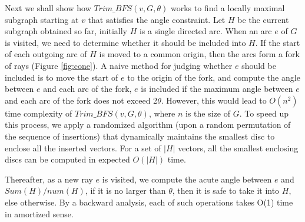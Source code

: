 Next we shall show how $Trim\_BFS(v, G, \theta)$ works to find a locally maximal subgraph starting at $v$ that satisfies the angle constraint. Let $H$ be the current subgraph obtained so far, initially $H$ is a single directed arc. When an arc $e$ of $G$ is visited, we need to determine whether it should be included into $H$. If the start of each outgoing arc of $H$ is moved to a common origin, then the arcs form a fork of rays (Figure \ref{fig:cone}). A naive method for judging whether $e$ should be included is to move the start of $e$ to the origin of the fork, and compute the angle between $e$ and each arc of the fork, $e$ is included if the maximum angle between $e$ and each arc of the fork does not exceed 2$\theta$. However, this would lead to $O(n^{2})$ time complexity of $Trim\_BFS(v, G, \theta)$, where $n$ is the size of $G$. To speed up this process, we apply a randomized algorithm (upon a random permutation of the sequence of insertions) that dynamically maintains the smallest disc to enclose all the inserted vectors. For a set of $|H|$ vectors, all the smallest enclosing discs can be computed in expected $O(|H|)$ time. {\color{red}{[de Berg M, van Kreveld M, Overmars M, Schwarzkopf O. Computational geometry: algorithms and applications. 3rd ed. Berlin, Germany: Springer-Verlag; 2008.]}}

Thereafter, as a new ray $e$ is visited, we compute the acute angle between $e$ and $Sum(H)/num(H)$, if it is no larger than $\theta$, then it is safe to take it into $H$, else otherwise. By a backward analysis, each of such operations takes O(1) time in amortized sense.

